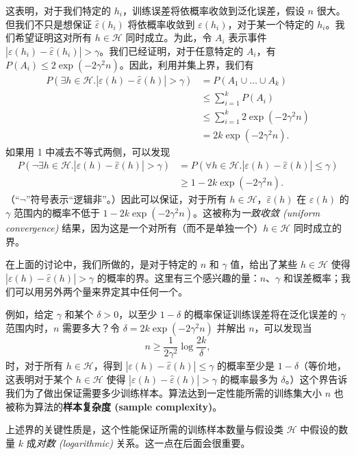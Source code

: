 这表明，对于我们特定的 $h_i$，训练误差将依概率收敛到泛化误差，假设 $n$ 很大。但我们不只是想保证 $\hat{\varepsilon}(h_i)$ 将依概率收敛到 $\varepsilon(h_i)$，对于某一个特定的 $h_i$。我们希望证明这对所有 $h \in \mathcal{H}$ 同时成立。为此，令 $A_i$ 表示事件 $|\varepsilon(h_i) - \hat{\varepsilon}(h_i)| > \gamma$。我们已经证明，对于任意特定的 $A_i$，有 $P(A_i) \leq 2 \exp(-2\gamma^2 n)$。因此，利用并集上界，我们有
\begin{align*}
    P(\exists h \in \mathcal{H}. |\varepsilon(h) - \hat{\varepsilon}(h)| > \gamma) 
    &= P(A_1 \cup \dots \cup A_k) \\
    & \leq \sum_{i=1}^k P(A_i) \\
    & \leq \sum_{i=1}^k 2 \exp(-2\gamma^2 n) \\
    & = 2k \exp(-2\gamma^2 n).
\end{align*}
如果用 1 中减去不等式两侧，可以发现
\begin{align*}
    P(\neg \exists h \in \mathcal{H}. |\varepsilon(h) - \hat{\varepsilon}(h)| > \gamma) 
    & = P(\forall h \in \mathcal{H}. |\varepsilon(h) - \hat{\varepsilon}(h)| \leq \gamma) \\
    & \geq 1 - 2k \exp(-2\gamma^2 n).
\end{align*}
（“$\neg$”符号表示“逻辑非”。）因此可以保证，对于所有 $h \in \mathcal{H}$，$\hat{\varepsilon}(h)$ 在 $\varepsilon(h)$ 的 $\gamma$ 范围内的概率不低于 $1 - 2k \exp(-2\gamma^2 n)$。这被称为\textit{一致收敛 (uniform convergence)} 结果，因为这是一个对所有（而不是单独一个）$h \in \mathcal{H}$ 同时成立的界。

在上面的讨论中，我们所做的，是对于特定的 $n$ 和 $\gamma$ 值，给出了某些 $h \in \mathcal{H}$ 使得 $|\varepsilon(h) - \hat{\varepsilon}(h)| > \gamma$ 的概率的界。这里有三个感兴趣的量：$n$、$\gamma$ 和误差概率；我们可以用另外两个量来界定其中任何一个。

例如，给定 $\gamma$ 和某个 $\delta > 0$，以至少 $1 - \delta$ 的概率保证训练误差将在泛化误差的 $\gamma$ 范围内时，$n$ 需要多大？令 $\delta = 2k \exp(-2\gamma^2 n)$ 并解出 $n$，可以发现当
\[
    n \geq \frac{1}{2\gamma^2} \log \frac{2k}{\delta},
\]
时，对于所有 $h \in \mathcal{H}$，得到 $|\varepsilon(h) - \hat{\varepsilon}(h)| \leq \gamma$ 的概率至少是 $1 - \delta$（等价地，这表明对于某个 $h \in \mathcal{H}$ 使得 $|\varepsilon(h) - \hat{\varepsilon}(h)| > \gamma$ 的概率最多为 $\delta$。）这个界告诉我们为了做出保证需要多少训练样本。算法达到一定性能所需的训练集大小 $n$ 也被称为算法的\textbf{样本复杂度 (sample complexity)}。

上述界的关键性质是，这个性能保证所需的训练样本数量与假设类 $\mathcal{H}$ 中假设的数量 $k$ 成\textit{对数 (logarithmic)} 关系。这一点在后面会很重要。


